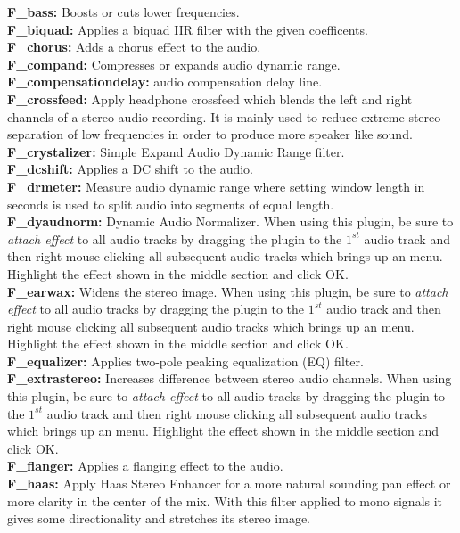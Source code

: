 \textbf{F\_bass:} Boosts or cuts lower frequencies.\\
\textbf{F\_biquad:} Applies a biquad IIR filter with the given coefficents.\\
\textbf{F\_chorus:} Adds a chorus effect to the audio.\\
\textbf{F\_compand:} Compresses or expands audio dynamic range.\\
\textbf{F\_compensationdelay:} audio compensation delay line.\\
\textbf{F\_crossfeed:} Apply headphone crossfeed which blends the left and right channels of a stereo audio recording. It is mainly used to reduce extreme stereo separation of low frequencies in order to produce more speaker like sound.\\
\textbf{F\_crystalizer:} Simple Expand Audio Dynamic Range filter.\\
\textbf{F\_dcshift:} Applies a DC shift to the audio.\\
\textbf{F\_drmeter:} Measure audio dynamic range where setting window length in seconds is used to split audio into segments of equal length.\\
\textbf{F\_dyaudnorm:} Dynamic Audio Normalizer. When using this plugin, be sure to \textit{attach effect} to all audio tracks by dragging the plugin to the $1^{st}$ audio track and then right mouse clicking all subsequent audio tracks which brings up an menu. Highlight the effect shown in the middle section and click OK.\\
\textbf{F\_earwax:} Widens the stereo image. When using this plugin, be sure to \textit{attach effect} to all audio tracks by dragging the plugin to the $1^{st}$ audio track and then right mouse clicking all subsequent audio tracks which brings up an menu. Highlight the effect shown in the middle section and click OK.\\
\textbf{F\_equalizer:} Applies two-pole peaking equalization (EQ) filter.\\
\textbf{F\_extrastereo:} Increases difference between stereo audio channels. When using this plugin, be sure to \textit{attach effect} to all audio tracks by dragging the plugin to the $1^{st}$ audio track and then right mouse clicking all subsequent audio tracks which brings up an menu. Highlight the effect shown in the middle section and click OK.\\
\textbf{F\_flanger:} Applies a flanging effect to the audio.\\
\textbf{F\_haas:} Apply Haas Stereo Enhancer for a more natural sounding pan effect or more clarity in the center of the mix. With this filter applied to mono signals it gives some directionality and stretches its stereo image.\\
